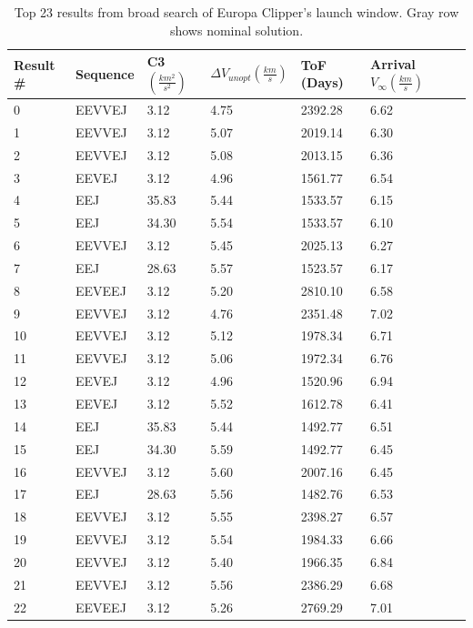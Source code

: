 \documentclass[letterpaper, preprint, paper,11pt]{AAS}	%
\begin{document}
\begin{table}[h!]
    \centering
    \caption{Top 23 results from broad search of Europa Clipper's launch window. Gray row shows nominal solution.}
    \begin{tabular}{l|llllll}
        Result \# & Sequence   & C3 $(\frac{km^2}{s^2})$    & $\Delta V_{unopt} (\frac{km}{s})$   & ToF (Days)            & Arrival $V_\infty (\frac{km}{s})$            \\
        \hline
        0  & EEVVEJ & 3.12  & 4.75 & 2392.28 & 6.62  \\
        1  & EEVVEJ & 3.12  & 5.07 & 2019.14 & 6.30  \\
        2  & EEVVEJ & 3.12  & 5.08 & 2013.15 & 6.36  \\
        3  & EEVEJ  & 3.12  & 4.96 & 1561.77 & 6.54  \\
        4  & EEJ    & 35.83 & 5.44 & 1533.57 & 6.15  \\
        5  & EEJ    & 34.30 & 5.54 & 1533.57 & 6.10  \\
        6  & EEVVEJ & 3.12  & 5.45 & 2025.13 & 6.27  \\
        7  & EEJ    & 28.63 & 5.57 & 1523.57 & 6.17  \\
        \rowcolor{lightgray}8  & EEVEEJ & 3.12  & 5.20 & 2810.10 & 6.58  \\
        9  & EEVVEJ & 3.12  & 4.76 & 2351.48 & 7.02  \\
        10 & EEVVEJ & 3.12  & 5.12 & 1978.34 & 6.71  \\
        11 & EEVVEJ & 3.12  & 5.06 & 1972.34 & 6.76  \\
        12 & EEVEJ  & 3.12  & 4.96 & 1520.96 & 6.94  \\
        13 & EEVEJ  & 3.12  & 5.52 & 1612.78 & 6.41  \\
        14 & EEJ    & 35.83 & 5.44 & 1492.77 & 6.51  \\
        15 & EEJ    & 34.30 & 5.59 & 1492.77 & 6.45  \\
        16 & EEVVEJ & 3.12  & 5.60 & 2007.16 & 6.45  \\
        17 & EEJ    & 28.63 & 5.56 & 1482.76 & 6.53  \\
        18 & EEVVEJ & 3.12  & 5.55 & 2398.27 & 6.57  \\
        19 & EEVVEJ & 3.12  & 5.54 & 1984.33 & 6.66  \\
        20 & EEVVEJ & 3.12  & 5.40 & 1966.35 & 6.84  \\
        21 & EEVVEJ & 3.12  & 5.56 & 2386.29 & 6.68  \\
        22 & EEVEEJ & 3.12  & 5.26 & 2769.29 & 7.01 
    \end{tabular}
\end{table}
\end{document}
